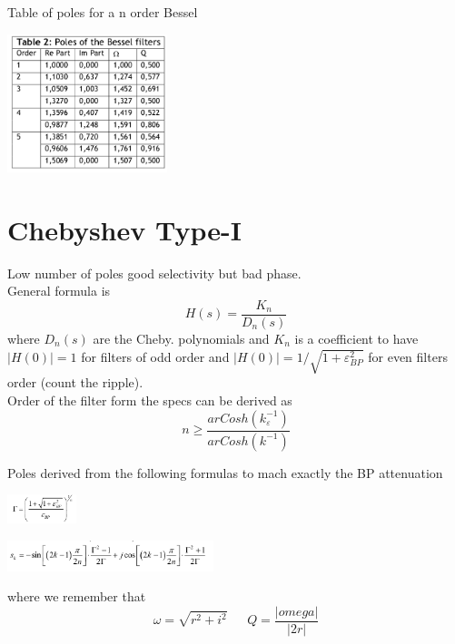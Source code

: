 Table of poles for a n order Bessel 

\centering
\includegraphics[width=0.35\textwidth]{bessel.png}\\
\raggedright

\section{Chebyshev Type-I}
Low number of poles good selectivity but bad phase.\\
General formula is
\begin{equation}
H(s)=\frac{K_n}{D_n(s)}
\end{equation}
where $D_n(s)$ are the Cheby. polynomials and $K_n$ is a coefficient to have $|H(0)|=1$ for filters of odd order and $|H(0)|=1/\sqrt{1+\varepsilon_{BP}^2}$ for even filters order (count the ripple).\\
\vspace{2mm}
Order of the filter form the specs can be derived as
\begin{equation}
n\ge \frac{arCosh(k_{\varepsilon}^{-1})}{arCosh(k^{-1})}
\end{equation} 

Poles derived from the following formulas to mach exactly the BP attenuation

\centering
\includegraphics[width=0.15\textwidth]{gamma.png}\\
\raggedright


\centering
\includegraphics[width=0.45\textwidth]{s.png}\\
\raggedright

where we remember that 
\begin{equation}
\omega=\sqrt{r^2+i^2} \ \ \ \ \ \ \ Q=\frac{|omega|}{|2r|}
\end{equation}

